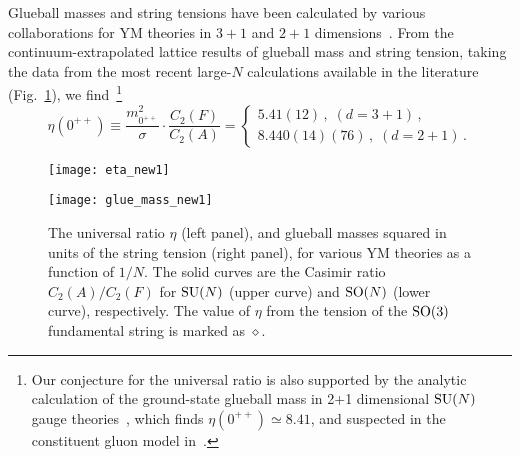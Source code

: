\documentclass[prl,aps,
showpacs,
preprint,
nofootinbib,
floatfix,
superscriptaddress, showkeys
]{revtex4-1}
\begin{document}
Glueball masses and string tensions have been calculated by various 
collaborations for YM theories in $3+1$ and $2+1$ dimensions~\cite{Morningstar:1999rf,Chen:2005mg,Lucini:2004my,Lucini:2012gg,Athenodorou:2016ebg,Athenodorou:2015nba,Lau:2015cna,Lau:2017aom}. 
From the continuum-extrapolated lattice results of glueball mass and string tension, taking the data from the most recent large-$N$ calculations available in the literature~\cite{Lucini:2004my,Athenodorou:2015nba,Lau:2017aom}
(Fig.~\ref{fig1}), we find~\footnote{Our conjecture for the universal ratio is also supported by the analytic calculation of 
the ground-state glueball mass in 2+1 dimensional ${\rm SU}(N)$ gauge theories~\cite{Leigh:2006vg}, which finds $\eta(0^{++})\simeq8.41$, and suspected in the constituent gluon model in~\cite{Buisseret:2011bg}.}
\begin{equation}
\eta(0^{++})\equiv\frac{m_{0^{++}}^2}{\sigma}\cdot\frac{C_2(F)}{C_2(A)} =
\begin{cases} 5.41(12)\,,\;%
(d=3+1)\,,\\
8.440(14)(76)\,,\;
(d=2+1)\,.
\end{cases}
\label{eq_eta}
\end{equation}
\begin{figure}[t]
\hspace{-.2in}
    \centering
    \begin{minipage}{0.48\textwidth}
        \centering
        \texttt{[image: eta\_new1]}
    \end{minipage}%
\hspace{.1in}
    \begin{minipage}{0.48\textwidth}
        \centering
        \texttt{[image: glue\_mass\_new1]}
    \end{minipage}
  \caption{
The universal ratio $\eta$ (left panel), and glueball masses squared in units of the string tension (right panel),
 for various YM theories as a function of $1/N$.
The solid curves are the Casimir ratio $C_2(A)/C_2(F)$  for ${\rm SU}(N)$ (upper curve) and ${\rm SO}(N)$ (lower curve), respectively. The value of $\eta$ from  the tension of the ${\rm SO}(3)$ fundamental string is marked as $\diamond$.
}
  \label{fig1}   
\end{figure}
\end{document}
